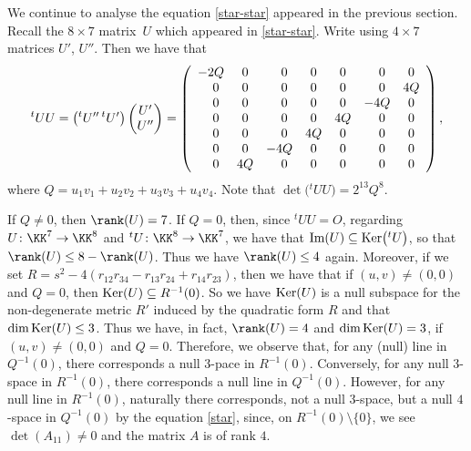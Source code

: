 We continue to analyse the equation \eqref{star-star} appeared in the previous section.
Recall the $8\times7$ matrix~$U$ which appeared in \eqref{star-star}.
Write  using $4\times 7$ matrices $U'$, $U''$.
Then we have that
\[
{}^tU U = \bigl({}^tU'' \, {}^t U'\bigr)\begin{pmatrix}U' \\ U''\end{pmatrix}
=
\left(
\begin{array}{ccccccc}
-2Q & 0 & \hphantom{-}0 & 0 & 0 & \hphantom{-}0 & 0
\\
\hphantom{-}0 & 0 & \hphantom{-}0 & 0 & 0 & \hphantom{-}0 & 4Q
\\
\hphantom{-}0 & 0 & \hphantom{-}0 & 0 & 0 & -4Q & 0
\\
\hphantom{-}0 & 0 & \hphantom{-}0 & 0 & 4Q & \hphantom{-}0 & 0
\\
\hphantom{-}0 & 0 & \hphantom{-}0 & 4Q & 0 & \hphantom{-}0 & 0
\\
\hphantom{-}0 & 0 & -4Q & 0 & 0 & \hphantom{-}0 & 0
\\
\hphantom{-}0 & 4Q & \hphantom{-}0 & 0 & 0 & \hphantom{-}0 & 0
\end{array}
\right),
\]
where $Q = u_1v_1 + u_2v_2 + u_3v_3 + u_4v_4$. Note that $\det\bigl({}^tU U\bigr) = 2^{13} Q^8$.

If $Q \not= 0$, then $\rank(U) = 7$. If $Q = 0$, then, since
${}^tU U = O$, regarding $U \colon \KK^7 \to \KK^8$ and
${}^tU \colon \KK^8 \to \KK^7$,
we have that ${\mbox{\rm Im}}(U) \subseteq {\rm Ker}\bigl({}^tU\bigr)$,
so that $\rank(U) \leq 8 - \rank(U)$. Thus we have $\rank(U) \leq 4$ again.
Moreover, if we set
$R = s^2 - 4(r_{12}r_{34} - r_{13}r_{24} + r_{14}r_{23})$, then
we have that if $(u, v) \not= (0, 0)$ and $Q = 0$, then ${\rm Ker}(U) \subseteq R^{-1}(0)$.
So we have ${\rm Ker}(U)$ is a null subspace for the non-degenerate
metric $R'$ induced by the quadratic form $R$ and that
$\dim{\rm Ker}(U) \leq 3$. Thus we have, in fact, $\rank(U) = 4$ and $\dim{\rm Ker}(U) = 3$, if $(u, v) \not= (0, 0)$ and $Q = 0$.
Therefore, we observe that, for any (null) line in $Q^{-1}(0)$, there corresponds a null $3$-pace in $R^{-1}(0)$.
Conversely, for any null $3$-space in $R^{-1}(0)$, there corresponds a null line in $Q^{-1}(0)$.
However, for any null line in $R^{-1}(0)$, naturally there corresponds,
not a null $3$-space, but a null $4$-space in $Q^{-1}(0)$
by the equation \eqref{star}, since, on $R^{-1}(0) \setminus \{ 0\}$, we see $\det(A_{11}) \not= 0$ and the matrix
$A$ is of rank $4$.


